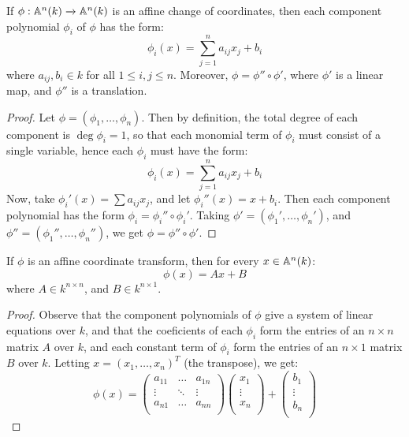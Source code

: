 \begin{lemma}\label{lemma_2.2.1}
  If $\phi:\mathbb{A}^n(k) \xrightarrow{} \mathbb{A}^n(k)$ is an affine change of coordinates,
  then each component polynomial $\phi_i$ of  $\phi$ has the form:
  \begin{equation}\label{equation_2.2}
    \phi_i(x)=\sum_{j=1}^n{a_{ij}x_j}+b_i
  \end{equation}
  where $a_{ij}, b_i \in k$ for all $1 \leq i,j \leq n$. Moreover, $\phi=\phi''
  \circ \phi'$, where $\phi'$ is a linear map, and $\phi''$ is a translation.
\end{lemma}
\begin{proof}
  Let $\phi=(\phi_1, \dots, \phi_n)$. Then by definition, the total degree of
  each component is $\deg{\phi_i}=1$, so that each monomial term of $\phi_i$
  must consist of a single variable, hence each $\phi_i$ must have the form:
  \begin{equation*}
    \phi_i(x)=\sum_{j=1}^n{a_{ij}x_j}+b_i
  \end{equation*}
  Now, take $\phi_i'(x)=\sum{a_{ij}x_j}$, and let $\phi_i''(x)=x+b_i$. Then each
  component polynomial has the form $\phi_i=\phi_i'' \circ \phi_i'$. Taking
  $\phi'=(\phi_1', \dots, \phi_n')$, and $\phi''=(\phi_1'', \dots, \phi_n'')$,
  we get $\phi=\phi'' \circ \phi'$.
\end{proof}
\begin{corollary}
  If $\phi$ is an affine coordinate transform, then for every $x \in \mathbb{A}^n(k)$:
  \begin{equation}\label{equation_2.3}
    \phi(x)=Ax+B
  \end{equation}
  where $A \in k^{n \times n}$, and $B \in k^{n \times 1}$.
\end{corollary}
\begin{proof}
  Observe that the component polynomials of $\phi$ give a system of linear
  equations over $k$, and that the coeficients of each $\phi_i$ form the entries
  of an $n \times n$ matrix $A$ over $k$, and each constant term of $\phi_i$
  form the  entries of an $n \times 1$ matrix $B$ over $k$. Letting $x=(x_1,
  \dots, x_n)^T$ (the transpose), we get:
  \begin{equation*}
    \phi(x)=
    \begin{pmatrix}
      a_{11}    &   \dots   &   a_{1n}  \\
      \vdots    &   \ddots  &   \vdots  \\
      a_{n1}    &   \dots   &   a_{nn}  \\
    \end{pmatrix}
    \begin{pmatrix}
      x_1 \\  \vdots  \\  x_n \\
    \end{pmatrix}
    +
    \begin{pmatrix}
      b_1 \\  \vdots  \\  b_n \\
    \end{pmatrix}
  \end{equation*}
\end{proof}

